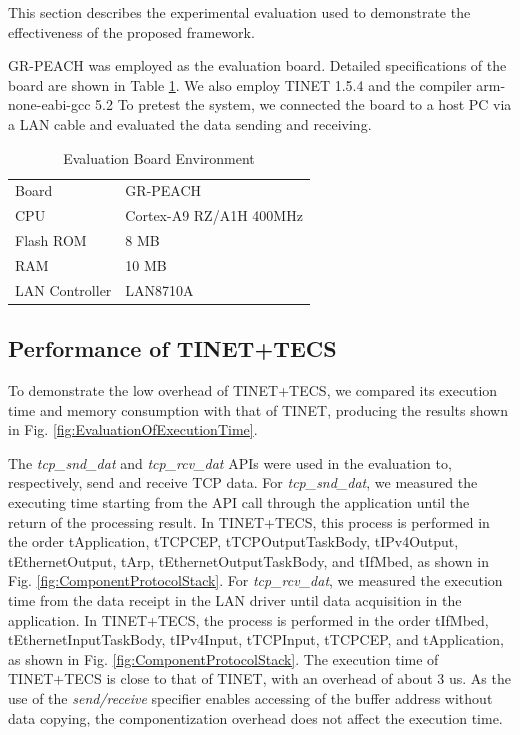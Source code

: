 \documentclass[JIP]{ipsj_v2/UTF8/ipsj}
\begin{document}
This section describes the experimental evaluation used to demonstrate the effectiveness of the proposed framework.


GR-PEACH was employed as the evaluation board.
Detailed specifications of the board are shown in Table \ref{tab:EvaluationBoardEnvironment}.
We also employ TINET 1.5.4 and the compiler arm-none-eabi-gcc 5.2
To pretest the system, we connected the board to a host PC via a LAN cable and evaluated the data sending and receiving.

\begin{table}[t]
    \centering
    \caption{Evaluation Board Environment}
    \begin{tabular}{l|l}
        \hline\hline
        Board           &   GR-PEACH                \\
        CPU             &   Cortex-A9 RZ/A1H 400MHz \\
        Flash ROM       &   8 MB                    \\
        RAM             &   10 MB                   \\
        LAN Controller  &   LAN8710A                \\
        \hline
    \end{tabular}
    \label{tab:EvaluationBoardEnvironment}
\end{table}

\subsection{Performance of TINET+TECS}

To demonstrate the low overhead of TINET+TECS, we compared its execution time and memory consumption with that of TINET, producing the results shown in Fig. \ref{fig:EvaluationOfExecutionTime}.

The {\it tcp\_snd\_dat} and {\it tcp\_rcv\_dat} APIs were used in the evaluation to, respectively, send and receive TCP data.
For {\it tcp\_snd\_dat}, we measured the executing time starting from the API call through the application until the return of the processing result.
In TINET+TECS, this process is performed in the order tApplication, tTCPCEP, tTCPOutputTaskBody, tIPv4Output, tEthernetOutput, tArp, tEthernetOutputTaskBody, and tIfMbed, as shown in Fig. \ref{fig:ComponentProtocolStack}.
For {\it tcp\_rcv\_dat}, we measured the execution time from the data receipt in the LAN driver until data acquisition in the application.
In TINET+TECS, the process is performed in the order tIfMbed, tEthernetInputTaskBody, tIPv4Input, tTCPInput, tTCPCEP, and tApplication, as shown in Fig. \ref{fig:ComponentProtocolStack}.
The execution time of TINET+TECS is close to that of TINET, with an overhead of about 3 us.
As the use of the {\it send/receive} specifier enables accessing of the buffer address without data copying, the componentization overhead does not affect the execution time.
\end{document}

